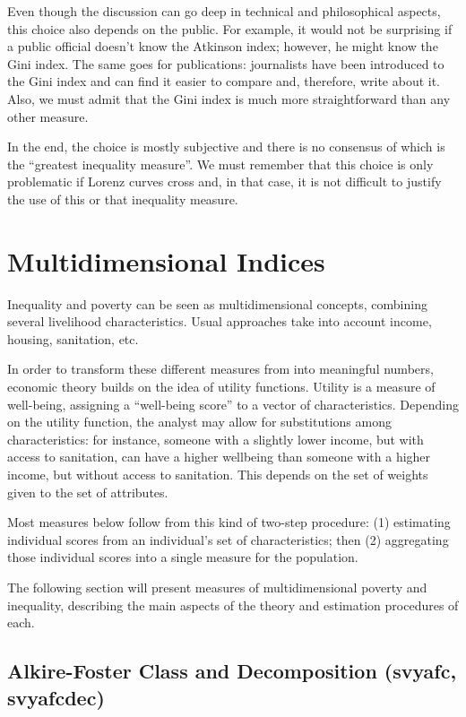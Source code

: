 \documentclass[]{book}
\begin{document}
Even though the discussion can go deep in technical and philosophical aspects, this choice also depends on the public. For example, it would not be surprising if a public official doesn't know the Atkinson index; however, he might know the Gini index. The same goes for publications: journalists have been introduced to the Gini index and can find it easier to compare and, therefore, write about it. Also, we must admit that the Gini index is much more straightforward than any other measure.

In the end, the choice is mostly subjective and there is no consensus of which is the ``greatest inequality measure''. We must remember that this choice is only problematic if Lorenz curves cross and, in that case, it is not difficult to justify the use of this or that inequality measure.

\hypertarget{multidimensional}{%
\chapter{Multidimensional Indices}\label{multidimensional}}

Inequality and poverty can be seen as multidimensional concepts, combining several livelihood characteristics. Usual approaches take into account income, housing, sanitation, etc.

In order to transform these different measures from into meaningful numbers, economic theory builds on the idea of utility functions. Utility is a measure of well-being, assigning a ``well-being score'' to a vector of characteristics. Depending on the utility function, the analyst may allow for substitutions among characteristics: for instance, someone with a slightly lower income, but with access to sanitation, can have a higher wellbeing than someone with a higher income, but without access to sanitation. This depends on the set of weights given to the set of attributes.

Most measures below follow from this kind of two-step procedure: (1) estimating individual scores from an individual's set of characteristics; then (2) aggregating those individual scores into a single measure for the population.

The following section will present measures of multidimensional poverty and inequality, describing the main aspects of the theory and estimation procedures of each.

\hypertarget{alkire-foster-class-and-decomposition-svyafc-svyafcdec}{%
\section{Alkire-Foster Class and Decomposition (svyafc, svyafcdec)}\label{alkire-foster-class-and-decomposition-svyafc-svyafcdec}}
\end{document}

